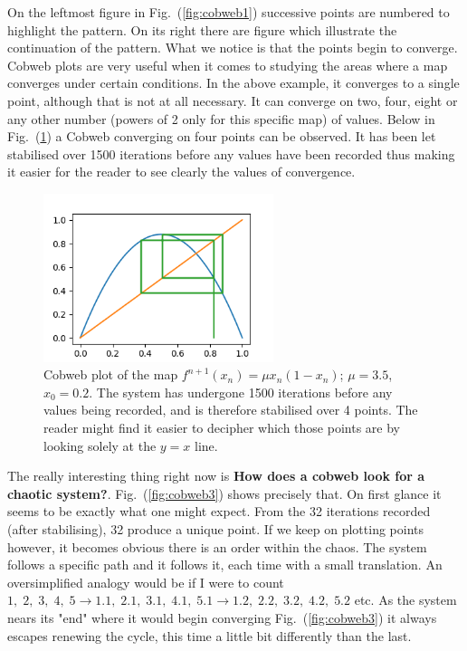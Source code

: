 On the leftmost figure in Fig.~(\ref{fig:cobweb1}) successive points are numbered to highlight the pattern. On its right
there are figure which illustrate the continuation of the pattern. What we notice is that the points begin to converge.
Cobweb plots are very useful when it comes to studying the areas where a map converges under certain conditions. In the above
example, it converges to a single point, although that is not at all necessary. It can converge on two, four, eight or any other number
(powers of 2 only for this specific map) of values. Below in Fig.~(\ref{fig:cobweb2}) a Cobweb converging on four points can be observed.
It has been let stabilised over 1500 iterations before any values have been recorded thus making it easier for the reader to see clearly
the values of convergence.

\begin{figure}[h]
    \centering
    \includegraphics[width=0.6\textwidth]{Images/cobweb5.png}
    \caption{Cobweb plot of the map $f^{n+1}(x_n)=\mu x_n (1-x_n)$; $\mu = 3.5$, $x_0 = 0.2$. The system has undergone 1500 iterations before any values
    being recorded, and is therefore stabilised over 4 points. The reader might find it easier to decipher which those points are
    by looking solely at the $y=x$ line.}
    \label{fig:cobweb2}
\end{figure}

The really interesting thing right now is \textbf{How does a cobweb look for a chaotic system?}. Fig.~(\ref{fig:cobweb3}) shows precisely that.
On first glance it seems to be exactly what one might expect. From the 32 iterations recorded (after stabilising), 32 produce a unique point.
If we keep on plotting points however, it becomes obvious there is an order within the chaos. The system follows a specific path and it follows it,
each time with a small translation. An oversimplified analogy would be if I were to count $1,\;2,\;3,\;4,\;5 \to 1.1,\;2.1,\;3.1,\;4.1,\;5.1
\to 1.2,\;2.2,\;3.2,\;4.2,\;5.2$ etc. As the system nears its "end" where it would begin converging Fig.~(\ref{fig:cobweb3}) it always escapes
renewing the cycle, this time a little bit differently than the last.

